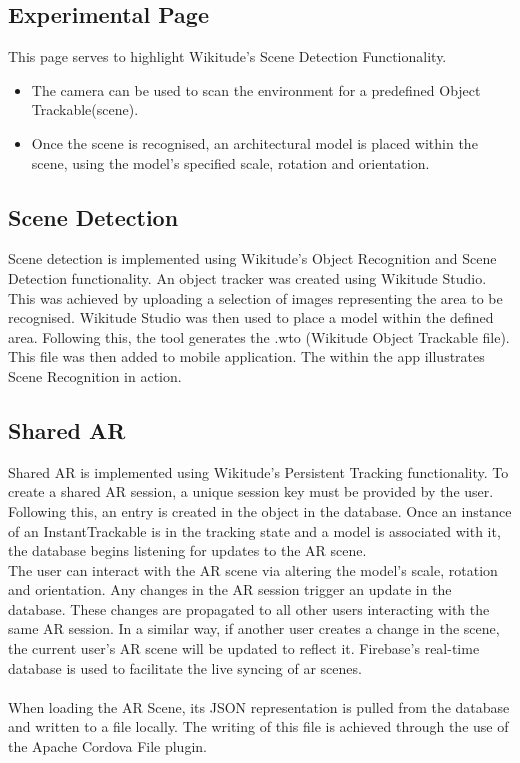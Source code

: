 \subsection{Experimental Page}
 This page serves to highlight Wikitude's Scene Detection Functionality. 
 \begin{itemize}
     \item The camera can be used to scan the environment for a predefined Object Trackable(scene). 
     \item Once the scene is recognised, an architectural model is placed within the scene, using the model's specified scale, rotation and orientation.
 \end{itemize}



\subsection{Scene Detection}
Scene detection is implemented using Wikitude's Object Recognition and Scene Detection functionality. An object tracker was created using Wikitude Studio. This was achieved by uploading a selection of images representing the area to be recognised. Wikitude Studio was then used to place a model within the defined area. Following this, the tool generates the .wto (Wikitude Object Trackable file). This file was then added to mobile application. The   within the app illustrates Scene Recognition in action. 

\subsection{Shared AR}
Shared AR is implemented using Wikitude's Persistent Tracking functionality. To create a shared AR session, a unique session key must be provided by the user. Following this, an entry is created in the  object in the database. Once an instance of an InstantTrackable is in the tracking state and a model is associated with it, the database begins listening for updates to the AR scene. 
\\  
The user can interact with the AR scene via altering the model’s scale, rotation and orientation. Any changes in the AR session trigger an update in the database. These changes are propagated to all other users interacting with the same AR session. In a similar way, if another user creates a change in the scene, the current user’s AR scene will be updated to reflect it. Firebase’s real-time database is used to facilitate the live syncing of ar scenes. 
\\  \\
When loading the AR Scene, its JSON representation is pulled from the database and written to a file locally. The writing of this file is achieved through the use of the Apache Cordova File plugin.


